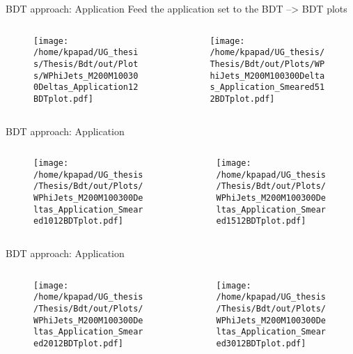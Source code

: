 \documentclass[bigger]{beamer}
\begin{document}
\begin{frame}[label={sec:orgceeb587}]{BDT approach: Application}
Feed the application set to the BDT --> BDT plots
\begin{columns}
\begin{column}{0.5\columnwidth}
\begin{figure}[h]
\centering
\texttt{[image: /home/kpapad/UG\_thesis/Thesis/Bdt/out/Plots/WPhiJets\_M200M100300Deltas\_Application12BDTplot.pdf]}
\end{figure}
\end{column}
\begin{column}{0.5\columnwidth}
\begin{figure}[h]
\centering
\texttt{[image: /home/kpapad/UG\_thesis/Thesis/Bdt/out/Plots/WPhiJets\_M200M100300Deltas\_Application\_Smeared512BDTplot.pdf]}
\end{figure}
\end{column}
\end{columns}
\end{frame}

\begin{frame}[label={sec:orgafbb629}]{BDT approach: Application}
\begin{columns}
\begin{column}{0.5\columnwidth}
\begin{figure}[h]
\centering
\texttt{[image: /home/kpapad/UG\_thesis/Thesis/Bdt/out/Plots/WPhiJets\_M200M100300Deltas\_Application\_Smeared1012BDTplot.pdf]}
\end{figure}
\end{column}
\begin{column}{0.5\columnwidth}
\begin{figure}[h]
\centering
\texttt{[image: /home/kpapad/UG\_thesis/Thesis/Bdt/out/Plots/WPhiJets\_M200M100300Deltas\_Application\_Smeared1512BDTplot.pdf]}
\end{figure}
\end{column}
\end{columns}
\end{frame}

\begin{frame}[label={sec:org5a25930}]{BDT approach: Application}
\begin{columns}
\begin{column}{0.5\columnwidth}
\begin{figure}[h]
\centering
\texttt{[image: /home/kpapad/UG\_thesis/Thesis/Bdt/out/Plots/WPhiJets\_M200M100300Deltas\_Application\_Smeared2012BDTplot.pdf]}
\end{figure}
\end{column}
\begin{column}{0.5\columnwidth}
\begin{figure}[h]
\centering
\texttt{[image: /home/kpapad/UG\_thesis/Thesis/Bdt/out/Plots/WPhiJets\_M200M100300Deltas\_Application\_Smeared3012BDTplot.pdf]}
\end{figure}
\end{column}
\end{columns}
\end{frame}
\end{document}
